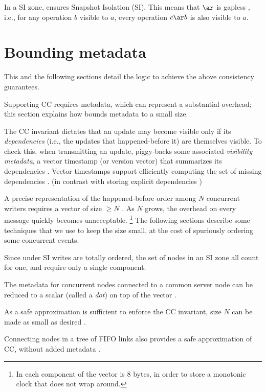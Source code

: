 In a SI zone, \system{} ensures Snapshot Isolation (SI).
This means that $\ar$ is gapless \cite{syn:formel:sh190}, i.e., for any
operation $b$ visible to $a$, every operation $c \ar b$ is also visible
to $a$.

\section{Bounding metadata}
\label{sec:bounding-metadata}

This and the following sections detail the logic to achieve the above
consistency guarantees.

Supporting CC requires metadata, which can represent a substantial
overhead; this section explains how \system{} bounds metadata to a small
size.

The CC invariant dictates that an update may become visible only
if its \emph{dependencies} (i.e., the updates that happened-before it)
are themselves visible.
To check this, when transmitting an update, \system{} piggy-backs some
associated \emph{visibility metadata}, a vector timestamp (or version
vector) that summarizes its dependencies \cite{alg:rep:738,
  alg:rep:738bis}.
Vector timestamps support efficiently computing the set
of missing dependencies \cite{rep:con:1414}.
(in contrast with storing explicit dependencies \cite{rep:syn:1662})

A precise representation of the happened-before order among $N$
concurrent writers requires a vector of size $\ge N$ \cite{syn:1707}.
As $N$ grows, the overhead on every message quickly becomes unacceptable.%
%
\footnote{
  In \system{} each component of the vector is 8 bytes, in order to
  store a monotonic clock that does not wrap around.
}
%
The following sections describe some techniques that we use
to keep the size small, at the cost of spuriously ordering some concurrent events.
\begin{inparaenum}[\textit (i)]
\item
  Since under SI writes are totally ordered, the set of nodes in an SI
  zone all count for one, and require only a single component.
\item
  The metadata for concurrent nodes connected to a common server node
  can be reduced to a scalar (called a \emph{dot}) on top of the vector
  \cite{rep:alg:1724}.
\item 
  As a safe approximation is sufficient to enforce the CC invariant,
  size $N$ can be made as small as desired \cite{rep:syn:1680}.
\item
  Connecting nodes in a tree of FIFO links also provides a safe
  approximation of CC, without added metadata \cite{db:syn:1808}.
\end{inparaenum}

